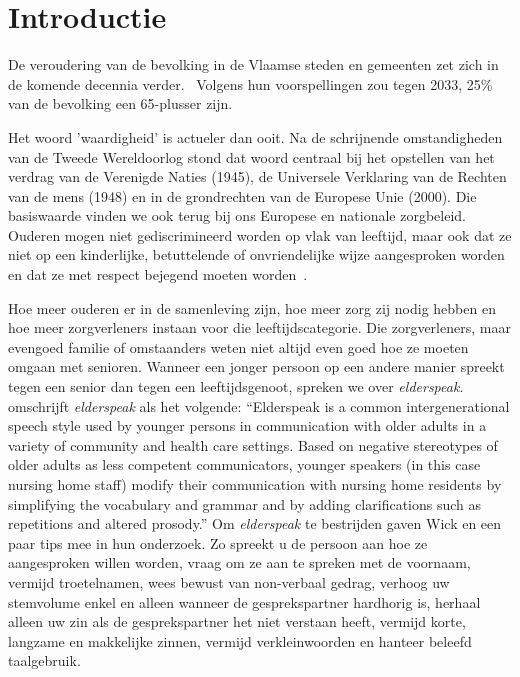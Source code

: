 

\section{Introductie}\label{sec:introductie} %

De veroudering van de bevolking in de Vlaamse steden en gemeenten zet zich in de komende  decennia verder.~\autocite{StatistiekVlaanderen2018}
Volgens hun voorspellingen zou tegen 2033, 25\% van de bevolking een 65-plusser zijn.

Het woord 'waardigheid' is actueler dan ooit.
Na de schrijnende omstandigheden van de Tweede Wereldoorlog stond dat woord centraal bij het opstellen van het verdrag van de Verenigde Naties (1945), de Universele Verklaring van de Rechten van de mens (1948) en in de grondrechten van de Europese Unie (2000).
Die basiswaarde vinden we ook terug bij ons Europese en nationale zorgbeleid. Ouderen mogen niet gediscrimineerd worden op vlak van leeftijd, maar ook dat ze niet op een kinderlijke, betuttelende of onvriendelijke wijze aangesproken worden en dat ze met respect bejegend moeten worden~\autocite{Campens}.

Hoe meer ouderen er in de samenleving zijn, hoe meer zorg zij nodig hebben en hoe meer zorgverleners instaan voor die leeftijdscategorie.
Die zorgverleners, maar evengoed familie of omstaanders weten niet altijd even goed hoe ze moeten omgaan met senioren.
Wanneer een jonger persoon op een andere manier spreekt tegen een senior dan tegen een leeftijdsgenoot, spreken we over \textit{elderspeak}. \textcite{Williams2011} omschrijft \textit{elderspeak} als het volgende: \enquote{Elderspeak is a common intergenerational speech style used by younger persons in communication with older adults in a variety of community and health care settings. Based on negative stereotypes of older adults as less competent communicators, younger speakers (in this case nursing home staff) modify their communication with nursing home residents by simplifying the vocabulary and grammar and by adding clarifications such as repetitions and altered prosody.} Om \textit{elderspeak} te bestrijden gaven Wick en \textcite{Wick2007} een paar tips mee in hun onderzoek.
Zo spreekt u de persoon aan hoe ze aangesproken willen worden, vraag om ze aan te spreken met de voornaam, vermijd troetelnamen, wees bewust van non-verbaal gedrag, verhoog uw stemvolume enkel en alleen wanneer de gesprekspartner hardhorig is, herhaal alleen uw zin als de gesprekspartner het niet verstaan heeft, vermijd korte, langzame en makkelijke zinnen, vermijd verkleinwoorden en hanteer beleefd taalgebruik.

